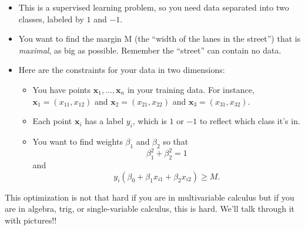 \documentclass[10pt]{article}
\renewcommand{\vec}[1]{\mathbf{#1}}
\begin{document}
\begin{itemize}
\item This is a supervised learning problem, so you need data separated into two classes, labeled by $1$ and $-1$.
\item  You want to find the margin M (the ``width of the lanes in the street'') that is \textit{maximal}, as big as possible. Remember the ``street'' can contain no data. 
\item Here are the constraints for your data in two dimensions:
\begin{itemize}
\item You have points $\vec{x}_1, \ldots, \vec{x}_n$ in your training data. For instance, $\vec{x}_1 = (x_{11}, x_{12})$ and $\vec{x}_2 = (x_{21}, x_{22})$ and $\vec{x}_3 = (x_{31}, x_{32})$. 
\item Each point $\vec{x}_i$ has a label $y_i$, which is $1$ or $-1$ to reflect which class it's in.
\item You want to find weights $\beta_1$ and $\beta_2$ so that \[\beta_1^2 +\beta_2^2=1\] and \[y_i (\beta_0 + \beta_1 x_{i1} + \beta_2 x_{i2}) \geq M.\]
\end{itemize}
\end{itemize}

This optimization is not that hard if you are in multivariable calculus \smiley{} but if you are in algebra, trig, or single-variable calculus, this is hard. We'll talk through it with pictures!!
\end{document}
